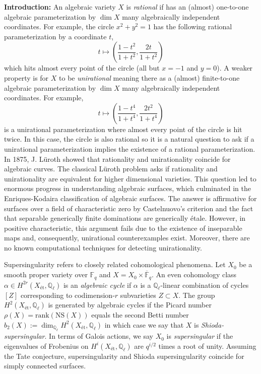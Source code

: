 \documentclass[11pt]{article}
\newcommand{\et}{\text{\'{e}t}}
\newcommand{\etale}{\'{e}tale\xspace}
\newcommand{\Q}{\mathbb{Q}}
\newcommand{\NS}[1]{\mathrm{NS}\left( #1 \right)}
\begin{document}
\textbf{Introduction:}
An algebraic variety $X$ is \textit{rational} if has an (almost) one-to-one algebraic parameterization by $\dim{X}$ many algebraically independent coordinates. For example, the circle $x^2 + y^2 = 1$ has the following rational parameterization by a coordinate $t$,
\[ t \mapsto \left( \frac{1-t^2}{1+t^2}, \frac{2t}{1 + t^2} \right) \]
which hits almost every point of the circle (all but $x = -1$ and $y = 0$).
A weaker property is for $X$ to be \textit{unirational} meaning there as a (almost) finite-to-one algebraic parameterization by $\dim{X}$ many algebraically independent coordinates. For example,
\[ t \mapsto \left( \frac{1 - t^4}{1 + t^4}, \frac{2 t^2}{1 + t^4} \right) \]
is a unirational parameterization where almost every point of the circle is hit twice. In this case, the circle is also rational so it is a natural question to ask if a unirational parameterization implies the existence of a rational parameterization. In 1875, J. L\"{u}roth showed  that rationality and unirationality coincide for algebraic curves. The classical L\"{u}roth problem asks if rationality and unirationality are equivalent for higher dimensional varieties. This question led to enormous progress in understanding algebraic surfaces, which culminated in the Enriques-Kodaira classification of algebraic surfaces.
The answer is affirmative for surfaces over a field of characteristic zero by Castelnuovo's criterion and the fact that separable generically finite dominations are generically \etale. However, in positive characteristic, this argument fails due to the existence of inseparable maps and, consequently, unirational counterexamples exist. Moreover, there are no known computational techniques for detecting unirationality.
\par
Supersingularity refers to closely related cohomological phenomena. Let $X_0$ be a smooth proper variety over $\mathbb{F}_q$ and $X = X_0 \times \overline{\mathbb{F}}_q$. An even cohomology class $\alpha \in H^{2r}(X_{\et}, \Q_\ell)$ is an \textit{algebraic cycle} if $\alpha$ is a $\Q_\ell$-linear combination of cycles $[Z]$ corresponding to codimension-$r$ subvarieties $Z \subset X$. The group $H^2(X_{\et}, \Q_{\ell})$ is generated by algebraic cycles if the Picard number $\rho(X) = \mathrm{rank}(\NS{X})$ equals the second Betti number $b_2(X) := \dim_{\Q_\ell} H^2(X_{\et}, \Q_\ell)$ in which case we say that $X$ is \textit{Shioda-supersingular}. In terms of Galois actions, we say $X_0$ is \textit{supersingular} if the eigenvalues of Frobenius on $H^{i}(X_{\et}, \Q_\ell)$ are $q^{i/2}$ times a root of unity. Assuming the Tate conjecture, supersingularity and Shioda supersingularity coincide for simply connected surfaces.
\end{document}
